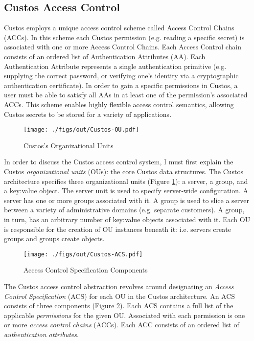 \subsection{Custos Access Control}
\label{chap:custos:arch:ac}

Custos employs a unique access control scheme called Access Control
Chains (ACCs). In this scheme each Custos permission (e.g. reading a
specific secret) is associated with one or more Access Control
Chains. Each Access Control chain consists of an ordered list of
Authentication Attributes (AA). Each Authentication Attribute
represents a single authentication primitive (e.g. supplying the
correct password, or verifying one's identity via a cryptographic
authentication certificate). In order to gain a specific permissions
in Custos, a user must be able to satisfy all AAs in at least one of
the permission's associated ACCs. This scheme enables highly flexible
access control semantics, allowing Custos secrets to be stored for a
variety of applications.

\begin{figure}[t]
  \centering
  \texttt{[image: ./figs/out/Custos-OU.pdf]}
  \caption{Custos's Organizational Units}
  \label{fig:custos-ou}
\end{figure}

In order to discuss the Custos access control system, I must first
explain the Custos \emph{organizational units} (OUs): the core Custos
data structures. The Custos architecture specifies three
organizational units (Figure \ref{fig:custos-ou}): a server, a group,
and a key:value object. The server unit is used to specify server-wide
configuration. A server has one or more groups associated with it. A
group is used to slice a server between a variety of administrative
domains (e.g. separate customers). A group, in turn, has an arbitrary
number of key:value objects associated with it. Each OU is responsible
for the creation of OU instances beneath it: i.e. servers create
groups and groups create objects.

\begin{figure}[t]
  \centering
  \texttt{[image: ./figs/out/Custos-ACS.pdf]}
  \caption{Access Control Specification Components}
  \label{fig:custos-acs}
\end{figure}

The Custos access control abstraction revolves around designating an
\emph{Access Control Specification} (ACS) for each OU in the Custos
architecture. An ACS consists of three components (Figure
\ref{fig:custos-acs}). Each ACS contains a full list of the applicable
\emph{permissions} for the given OU. Associated with each permission
is one or more \emph{access control chains} (ACCs). Each ACC consists
of an ordered list of \emph{authentication attributes}.

